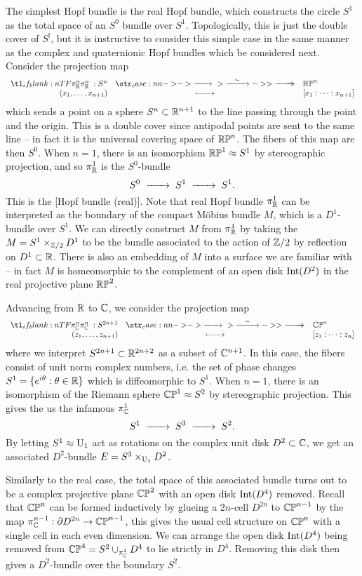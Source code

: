 The simplest Hopf bundle is the real Hopf bundle, which constructs the circle $S^1$ as the total space of an $S^0$ bundle over $S^1$. Topologically, this is just the double cover of $S^!$, but it is instructive to consider this simple case in the same manner as the complex and quaternionic Hopf bundles which be considered next.
Consider the projection map
\[
	\lkxfunc{\pi_\R^n}{S^n}{\RP^n}{(x_1,\ldots, x_{n+1})}{[x_1:\cdots: x_{n+1}]}
\]
which sends a point on a sphere $S^n\subset \mathbb{R}^{n+1}$ to the line passing through the point and the origin. This is a double cover since antipodal points are sent to the same line -- in fact it is the universal covering space of $\mathbb{RP}^n$. The fibers of this map are then $S^0$.
When $n=1$, there is an isomorphism $\mathbb{RP}^1\approx S^1$ by stereographic projection, and so $\pi_{\mathbb{R}}^1$ is the $S^0$-bundle
\[
	S^0 \lkxto S^1\lkxto S^1.
\]
This is the [Hopf bundle (real)]. Note that real Hopf bundle $\pi_{\mathbb{R}}^1$ can be interpreted as the boundary of the compact M\"obius bundle $M$, which is a $D^1$-bundle over $S^1$.
We can directly construct $M$ from $\pi_{\mathbb{R}}^1$ by taking the $M = S^1\times_{\mathbb{Z}/2} D^1$ to be the bundle associated to the action of $\mathbb{Z}/2$ by reflection on $D^1\subset \mathbb{R}$. There is also an embedding of $M$ into a surface we are familiar with -- in fact $M$ is homeomorphic to the complement of an open disk $\operatorname{Int}(D^2)$ in the real projective plane $\mathbb{RP}^2$.

Advancing from $\mathbb{R}$ to $\mathbb{C}$, we consider the projection map
\[
	\lkxfunc{\pi_\C^n}{S^{2n+1}}{\CP^n}{(z_1,\ldots, z_{n+1})}{[z_1:\cdots: z_n]}
\]
where we interpret $S^{2n+1}\subset \mathbb{R}^{2n+2}$ as a subset of $\mathbb{C}^{n+1}$.
In this case, the fibers consist of unit norm complex numbers, i.e. the set of phase changes $S^1=\{e^{i\theta} : \theta\in \mathbb{R}\}$ which is diffeomorphic to $S^1$.
When $n=1$, there is an isomorphism of the Riemann sphere $\mathbb{CP}^1\approx S^2$ by stereographic projection. This gives the us the infamous  $\pi_{\mathbb{C}}^1$
\[
	S^1 \lkxto S^3 \lkxto S^2.
\]
By letting $S^1\approx \mathrm{U}_1$ act as rotations on the complex unit disk $D^2\subset \mathbb{C}$, we get an associated $D^2$-bundle $E = S^3\times_{\mathrm{U}_1} D^2$.

Similarly to the real case, the total space of this associated bundle turns out to be a complex projective plane $\mathbb{CP}^2$ with an open disk $\operatorname{Int}(D^4)$ removed. Recall that $\mathbb{CP}^n$ can be formed inductively by glueing a $2n$-cell $D^{2n}$ to $\mathbb{CP}^{n-1}$ by the map $\pi_{\mathbb{C}}^{n-1} : \partial D^{2n} \to \mathbb{CP}^{n-1}$, this gives the usual cell structure on $\mathbb{CP}^n$ with a single cell in each even dimension.
We can arrange the open disk $\operatorname{Int}(D^4)$ being removed from $\mathbb{CP}^4 = S^2\cup_{\pi_{\mathbb{C}}^1} D^4$ to lie strictly in $D^4$. Removing this disk then gives a $D^2$-bundle over the boundary $S^2$.

